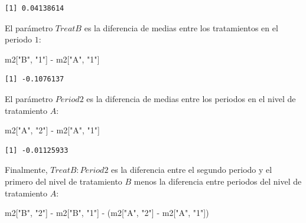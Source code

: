 \documentclass[
  12pt,
  a4paper,
  extrafontsizes,
  onecolumn,
  openright]{memoir}
\newenvironment{Shaded}{\begin{snugshade}}{\end{snugshade}}
\newcommand{\NormalTok}[1]{\textcolor[rgb]{0.00,0.23,0.31}{#1}}
\newcommand{\SpecialCharTok}[1]{\textcolor[rgb]{0.37,0.37,0.37}{#1}}
\newcommand{\StringTok}[1]{\textcolor[rgb]{0.13,0.47,0.30}{#1}}
\begin{document}
\begin{verbatim}
[1] 0.04138614
\end{verbatim}

\normalsize

El parámetro \(TreatB\) es la diferencia de medias entre los
tratamientos en el periodo \(1\):

\scriptsize

\begin{Shaded}
\begin{Highlighting}[]
\NormalTok{m2[}\StringTok{"B"}\NormalTok{, }\StringTok{"1"}\NormalTok{] }\SpecialCharTok{{-}}\NormalTok{ m2[}\StringTok{"A"}\NormalTok{, }\StringTok{"1"}\NormalTok{]}
\end{Highlighting}
\end{Shaded}

\begin{verbatim}
[1] -0.1076137
\end{verbatim}

\normalsize

El parámetro \(Period2\) es la diferencia de medias entre los periodos
en el nivel de tratamiento \(A\):

\scriptsize

\begin{Shaded}
\begin{Highlighting}[]
\NormalTok{m2[}\StringTok{"A"}\NormalTok{, }\StringTok{"2"}\NormalTok{] }\SpecialCharTok{{-}}\NormalTok{ m2[}\StringTok{"A"}\NormalTok{, }\StringTok{"1"}\NormalTok{]}
\end{Highlighting}
\end{Shaded}

\begin{verbatim}
[1] -0.01125933
\end{verbatim}

\normalsize

Finalmente, \(TreatB:Period2\) es la diferencia entre el segundo periodo
y el primero del nivel de tratamiento \(B\) menos la diferencia entre
periodos del nivel de tratamiento \(A\):

\scriptsize

\begin{Shaded}
\begin{Highlighting}[]
\NormalTok{m2[}\StringTok{"B"}\NormalTok{, }\StringTok{"2"}\NormalTok{] }\SpecialCharTok{{-}}\NormalTok{ m2[}\StringTok{"B"}\NormalTok{, }\StringTok{"1"}\NormalTok{] }\SpecialCharTok{{-}}\NormalTok{ (m2[}\StringTok{"A"}\NormalTok{, }\StringTok{"2"}\NormalTok{] }\SpecialCharTok{{-}}\NormalTok{ m2[}\StringTok{"A"}\NormalTok{, }\StringTok{"1"}\NormalTok{])}
\end{Highlighting}
\end{Shaded}
\end{document}
